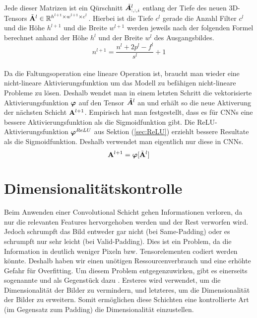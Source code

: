 \\
Jede dieser Matrizen ist ein Qürschnitt $\tilde{\bm{A}}^l_{:,:,i}$ entlang der
Tiefe des neuen 3D-Tensors $\tilde{\mathbf{A}}^l \in \mathbb{R}^{h^{l+1} \times w^{l+1} \times c^l}$.
Hierbei ist die Tiefe $c^l$ gerade die Anzahl Filter $c^l$ und die Höhe
$h^{l+1}$ und die Breite $w^{l+1}$ werden jeweils nach der folgenden Formel
berechnet anhand der Höhe $h^l$ und der Breite $w^l$ des Ausgangsbildes.
\\
\begin{equation}
  n^{l+1} = \frac{n^l + 2p^l - f^l}{s^l} + 1
\end{equation}
\\
Da die Faltungsoperation eine lineare Operation ist, braucht man wieder eine
nicht-lineare Aktivierungsfunktion um das Modell zu befähigen nicht-lineare Probleme zu
lösen.
Deshalb wendet man in einem letzten Schritt die vektorisierte Aktivierungsfunktion
$\bm{\varphi}$ auf den Tensor $\tilde{\bm{A}}^l$ an und erhält so die
neue Aktiverung der nächsten Schicht $\mathbf{A}^{l+1}$. Empirisch hat man
festgestellt, dass es für CNNs eine bessere Aktivierungsfunktion als die
Sigmoidfunktion gibt. Die ReLU-Aktivierungsfunktion $\bm{\varphi}^{ReLU}$ aus Sektion (\ref{sec:ReLU})
erziehlt bessere Resultate als die Sigmoidfunktion. Deshalb verwendet man
eigentlich nur diese in CNNs.
\begin{equation}
  \mathbf{A}^{l+1} = \bm{\varphi}[\tilde{\mathbf{A}}^l]
\end{equation}


\cite{wiki:cnn}
\cite{deeplearning.ai:cnn}
\cite{Goodfellow-et-al-2016}
\cite{Nielsen}

\section{Dimensionalitätskontrolle}
Beim Anwenden einer Convolutional Schicht gehen Informationen verloren, da nur
die relevanten Features hervorgehoben werden und der Rest verworfen wird. Jedoch
schrumpft das Bild entweder gar nicht (bei Same-Padding) oder es schrumpft nur
sehr leicht (bei Valid-Padding). Dies ist ein Problem, da die Information in
deutlich weniger Pixeln bzw. Tensorelementen codiert werden könnte. Deshalb
haben wir einen unötigen Ressourcenverbrauch und eine erhöhte Gefahr für
Overfitting. Um diesem Problem entgegenzuwirken, gibt es einerseits sogenannte
 und als Gegenstück dazu
. Ersteres wird verwendet, um die Dimensionalität
der Bilder zu vermindern, und letzteres, um die Dimensionalität der Bilder zu
erweitern. Somit ermöglichen diese Schichten eine kontrollierte Art (im Gegensatz zum
Padding) die Dimensionalität einzustellen.


